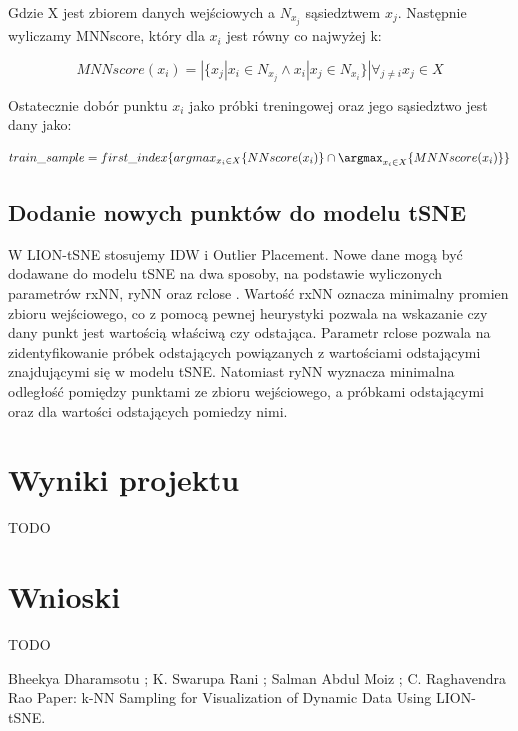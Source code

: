 \documentclass{article}
\begin{document}
Gdzie X jest zbiorem danych wejściowych a $N_x_j$ sąsiedztwem $x_j$. Następnie
wyliczamy MNNscore, który dla $x_i$ jest równy co najwyżej k:

\begin{equation}
    MNNscore(x_i) = |\{x_j | x_i \in N_x_j \wedge x_i | x_j \in N_x_i  \} | \forall_{j \neq i} x_j \in X
\end{equation}

Ostatecznie dobór punktu $x_i$ jako próbki treningowej oraz jego sąsiedztwo
jest dany jako:

\begin{equation}
    train\_sample = first\_index\{argmax_{x_i \in  X} \{NNscore(x_i)\} \cap \argmax_{x_i \in X} \{MNNscore(x_i)\}\}
\end{equation}

\subsection{Dodanie nowych punktów do modelu tSNE}

W LION-tSNE stosujemy IDW i Outlier Placement. Nowe dane mogą być
dodawane do modelu tSNE na dwa sposoby, na podstawie wyliczonych
parametrów rxNN, ryNN oraz rclose . Wartość rxNN oznacza minimalny
promien zbioru wejściowego, co z pomocą pewnej heurystyki pozwala na
wskazanie czy dany punkt jest wartością właściwą czy odstająca. Parametr
rclose pozwala na zidentyfikowanie próbek odstających powiązanych z
wartościami odstającymi znajdującymi się w modelu tSNE. Natomiast ryNN
wyznacza minimalna odległość pomiędzy punktami ze zbioru wejściowego,
a próbkami odstającymi oraz dla wartości odstających pomiedzy nimi.

\section{Wyniki projektu}
\label{sec:results}
TODO

\section{Wnioski}
\label{sec:conclusions}
TODO

  


\clearpage
\renewcommand\refname{Źródła}
\begin{thebibliography}{1}

Bheekya Dharamsotu ; K. Swarupa Rani ; Salman Abdul Moiz ; C. Raghavendra Rao
\newblock Paper: k-NN Sampling for Visualization of Dynamic Data Using LION-tSNE. 

\end{thebibliography}
\end{document}
